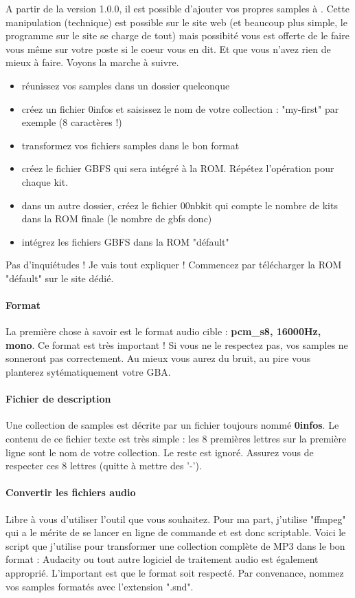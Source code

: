\label{sec:addsamples}

A partir de la version 1.0.0, il est possible d'ajouter vos propres samples à \FAT.
Cette manipulation (technique) est possible sur le site web (et beaucoup plus simple, le programme sur le site se charge de tout)
mais possibité vous est offerte de le faire vous même sur votre poste si le coeur vous en dit. Et que vous n'avez rien de mieux à faire.
Voyons la marche à suivre.
\medskip

\begin{itemize}
  \item{réunissez vos samples dans un dossier quelconque}
  \item{créez un fichier 0infos et saisissez le nom de votre collection : "my-first" par exemple (8 caractères !) }
  \item{transformez vos fichiers samples dans le bon format}
  \item{créez le fichier GBFS qui sera intégré à la ROM. Répétez l'opération pour chaque kit.}
  \item{dans un autre dossier, créez le fichier 00nbkit qui compte le nombre de kits dans la ROM finale (le nombre de gbfs donc)}
  \item{intégrez les fichiers GBFS dans la ROM "défault"}
\end{itemize}\medskip

Pas d'inquiétudes ! Je vais tout expliquer !
Commencez par télécharger la ROM "défault" sur le site dédié.

\paragraph{Format} La première chose à savoir est le format audio cible : {\bf pcm\_s8, 16000Hz, mono}.
Ce format est très important ! Si vous ne le respectez pas, vos samples ne sonneront pas correctement.
Au mieux vous aurez du bruit, au pire vous planterez sytématiquement votre GBA.

\paragraph{Fichier de description} Une collection de samples est décrite par un fichier toujours nommé {\bf 0infos}.
Le contenu de ce fichier texte est très simple : les 8 premières lettres sur la première ligne sont le nom de votre collection.
Le reste est ignoré. Assurez vous de respecter ces 8 lettres (quitte à mettre des '-').

\paragraph{Convertir les fichiers audio} Libre à vous d'utiliser l'outil que vous souhaitez.
Pour ma part, j'utilise "ffmpeg" qui a le mérite de se lancer en ligne de commande et est donc scriptable.
Voici le script que j'utilise pour transformer une collection complète de MP3 dans le bon format :
Audacity ou tout autre logiciel de traitement audio est également approprié.
L'important est que le format soit respecté.
Par convenance, nommez vos samples formatés avec l'extension ".snd".

